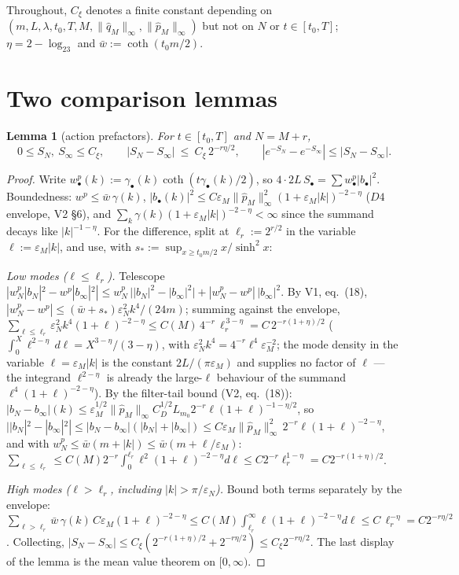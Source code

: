 \documentclass[11pt,a4paper]{article}
\theoremstyle{plain}
\newtheorem{lemma}[theorem]{Lemma}
\theoremstyle{definition}
\newcommand{\eps}{\varepsilon}
\DeclareMathOperator{\cth}{coth}
\DeclareMathOperator{\sh}{sinh}
\newcommand{\wbar}{\bar w}
\begin{document}
Throughout, $C_\xi$ denotes a finite constant depending on
$(m,L,\lambda,t_0,T,M,\|\widehat q_M\|_\infty,\|\widehat p_M\|_\infty)$
but not on $N$ or $t\in[t_0,T]$; $\eta=2-\log_23$ and
$\wbar:=\cth(t_0m/2)$.

\section{Two comparison lemmas}\label{sec:lemmas}

\begin{lemma}[action prefactors]\label{lem:action}
For $t\in[t_0,T]$ and $N=M+r$,
\[
 0\le S_N,\ S_\infty\le C_\xi,
 \qquad
 |S_N-S_\infty|\ \le\ C_\xi\,2^{-r\eta/2},
 \qquad
 |e^{-S_N}-e^{-S_\infty}|\le|S_N-S_\infty| .
\]
\end{lemma}

\begin{proof}
Write $w^p_\bullet(k):=\gamma_\bullet(k)\cth(t\gamma_\bullet(k)/2)$, so
$4\cdot2L\,S_\bullet=\sum w^p_\bullet|b_\bullet|^2$. Boundedness: $w^p\le
\wbar\,\gamma(k)$, $|b_\bullet(k)|^2\le C\eps_M\|\widehat
p_M\|_\infty^2(1+\eps_M|k|)^{-2-\eta}$ ($D4$ envelope, V2 \S6), and
$\sum_k\gamma(k)(1+\eps_M|k|)^{-2-\eta}<\infty$ since the summand decays
like $|k|^{-1-\eta}$. For the difference, split at
$\ell_r:=2^{r/2}$ in the variable $\ell:=\eps_M|k|$, and use, with
$s_*:=\sup_{x\ge t_0m/2}x/\sh^2x$:

\emph{Low modes ($\ell\le\ell_r$).} Telescope
$|w^p_N|b_N|^2-w^p|b_\infty|^2|\le
w^p_N\,\bigl||b_N|^2-|b_\infty|^2\bigr|
+|w^p_N-w^p|\,|b_\infty|^2$. By V1, eq.\ (18),
$|w^p_N-w^p|\le(\wbar+s_*)\eps_N^2k^4/(24m)$; summing against the
envelope, $\sum_{\ell\le\ell_r}\eps_N^2k^4(1+\ell)^{-2-\eta}
\le C(M)\,4^{-r}\,\ell_r^{\,3-\eta}=C\,2^{-r(1+\eta)/2}$
($\int_0^X\ell^{2-\eta}\,d\ell=X^{3-\eta}/(3-\eta)$, with
$\eps_N^2k^4=4^{-r}\ell^4\eps_M^{-2}$; the mode density in the variable
$\ell=\eps_M|k|$ is the constant $2L/(\pi\eps_M)$ and supplies no factor of $\ell$ ---
the integrand $\ell^{2-\eta}$ is already the large-$\ell$ behaviour of the summand
$\ell^4(1+\ell)^{-2-\eta}$). By the filter-tail bound (V2, eq.\ (18)):
$|b_N-b_\infty|(k)\le\eps_M^{1/2}\|\widehat p_M\|_\infty
C_D^{1/2}L_{m_0}2^{-r}\ell(1+\ell)^{-1-\eta/2}$, so
$||b_N|^2-|b_\infty|^2|\le|b_N-b_\infty|(|b_N|+|b_\infty|)
\le C\eps_M\|\widehat p_M\|_\infty^2\,2^{-r}\ell(1+\ell)^{-2-\eta}$,
and with $w^p_N\le\wbar(m+|k|)\le\wbar(m+\ell/\eps_M)$:
$\sum_{\ell\le\ell_r}\le C(M)2^{-r}\int_0^{\ell_r}
\ell^2(1+\ell)^{-2-\eta}d\ell\le C2^{-r}\ell_r^{1-\eta}
=C2^{-r(1+\eta)/2}$.

\emph{High modes ($\ell>\ell_r$, including $|k|>\pi/\eps_N$).} Bound both
terms separately by the envelope:
$\sum_{\ell>\ell_r}\wbar\,\gamma(k)\,
C\eps_M(1+\ell)^{-2-\eta}\le
C(M)\int_{\ell_r}^\infty\ell(1+\ell)^{-2-\eta}d\ell
\le C\,\ell_r^{-\eta}=C2^{-r\eta/2}$.
Collecting, $|S_N-S_\infty|\le C_\xi(2^{-r(1+\eta)/2}+2^{-r\eta/2})
\le C_\xi2^{-r\eta/2}$. The last display of the lemma is the mean value
theorem on $[0,\infty)$.
\end{proof}
\end{document}

